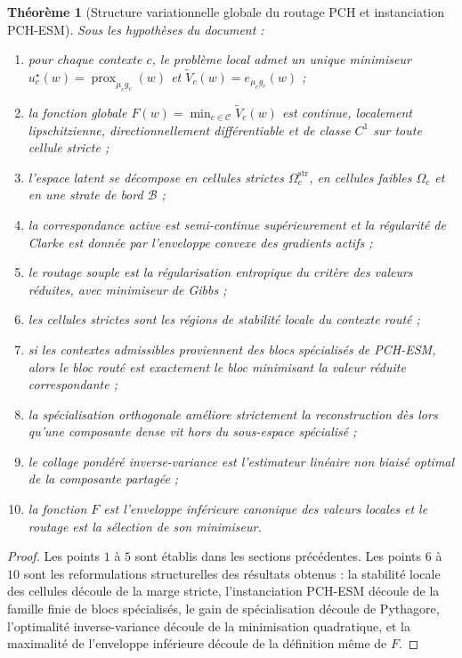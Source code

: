 \documentclass[11pt,a4paper]{article}
\newtheorem{theorem}{Théorème}[section]
\DeclareMathOperator{\prox}{prox}
\newcommand{\Ccal}{\mathcal C}
\newcommand{\Bcal}{\mathcal B}
\begin{document}
\begin{theorem}[Structure variationnelle globale du routage PCH et instanciation PCH-ESM]
Sous les hypothèses du document :
\begin{enumerate}[leftmargin=2em]
\item pour chaque contexte \(c\), le problème local admet un unique minimiseur \(u_c^\star(w)=\prox_{\mu_c g_c}(w)\) et \(\widetilde V_c(w)=e_{\mu_c g_c}(w)\) ;
\item la fonction globale \(F(w)=\min_{c\in\Ccal}\widetilde V_c(w)\) est continue, localement lipschitzienne, directionnellement différentiable et de classe \(C^1\) sur toute cellule stricte ;
\item l'espace latent se décompose en cellules strictes \(\Omega_c^{\mathrm{str}}\), en cellules faibles \(\Omega_c\) et en une strate de bord \(\Bcal\) ;
\item la correspondance active est semi-continue supérieurement et la régularité de Clarke est donnée par l'enveloppe convexe des gradients actifs ;
\item le routage souple est la régularisation entropique du critère des valeurs réduites, avec minimiseur de Gibbs ;
\item les cellules strictes sont les régions de stabilité locale du contexte routé ;
\item si les contextes admissibles proviennent des blocs spécialisés de PCH-ESM, alors le bloc routé est exactement le bloc minimisant la valeur réduite correspondante ;
\item la spécialisation orthogonale améliore strictement la reconstruction dès lors qu'une composante dense vit hors du sous-espace spécialisé ;
\item le collage pondéré inverse-variance est l'estimateur linéaire non biaisé optimal de la composante partagée ;
\item la fonction \(F\) est l'enveloppe inférieure canonique des valeurs locales et le routage est la sélection de son minimiseur.
\end{enumerate}
\end{theorem}

\begin{proof}
Les points \(1\) à \(5\) sont établis dans les sections précédentes. Les points \(6\) à \(10\) sont les reformulations structurelles des résultats obtenus : la stabilité locale des cellules découle de la marge stricte, l'instanciation PCH-ESM découle de la famille finie de blocs spécialisés, le gain de spécialisation découle de Pythagore, l'optimalité inverse-variance découle de la minimisation quadratique, et la maximalité de l'enveloppe inférieure découle de la définition même de \(F\).
\end{proof}
\end{document}
